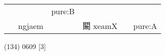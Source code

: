 \documentclass[14pt,a4paper]{scrartcl}
\begin{document}
\begin{longtable}[c]{@{}llllll@{}}
\begin{minipage}[t]{0.14\columnwidth}
\strut\end{minipage} &
\begin{minipage}[t]{0.14\columnwidth}\raggedright\strut
\strut\end{minipage} &
\begin{minipage}[t]{0.14\columnwidth}\raggedright\strut
pure:B
\strut\end{minipage}\tabularnewline
\begin{minipage}[t]{0.14\columnwidth}\raggedright\strut
𣪏
\strut\end{minipage} &
\begin{minipage}[t]{0.14\columnwidth}\raggedright\strut
ngjaem
\strut\end{minipage} &
\begin{minipage}[t]{0.14\columnwidth}\raggedright\strut
\strut\end{minipage} &
\begin{minipage}[t]{0.14\columnwidth}\raggedright\strut
闞 xeamX
\strut\end{minipage} &
\begin{minipage}[t]{0.14\columnwidth}\raggedright\strut
\strut\end{minipage} &
\begin{minipage}[t]{0.14\columnwidth}\raggedright\strut
pure:A
\strut\end{minipage}\tabularnewline
\bottomrule
\end{longtable}

(134) 0609 {[}3{]}
\end{document}
